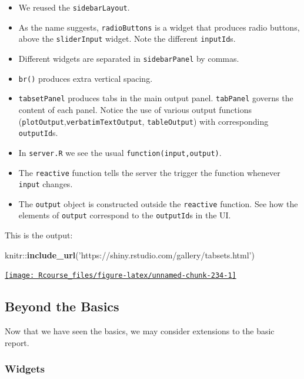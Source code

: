 \documentclass[]{book}
\newenvironment{Shaded}{\begin{snugshade}}{\end{snugshade}}
\newcommand{\KeywordTok}[1]{\textcolor[rgb]{0.13,0.29,0.53}{\textbf{{#1}}}}
\newcommand{\StringTok}[1]{\textcolor[rgb]{0.31,0.60,0.02}{{#1}}}
\newcommand{\NormalTok}[1]{{#1}}
\providecommand{\tightlist}{%
  \setlength{\itemsep}{0pt}\setlength{\parskip}{0pt}}
\theoremstyle{definition}
\theoremstyle{definition}
\theoremstyle{remark}
\begin{document}
\begin{itemize}
\tightlist
\item
  We reused the \texttt{sidebarLayout}.
\item
  As the name suggests, \texttt{radioButtons} is a widget that produces
  radio buttons, above the \texttt{sliderInput} widget. Note the
  different \texttt{inputId}s.
\item
  Different widgets are separated in \texttt{sidebarPanel} by commas.
\item
  \texttt{br()} produces extra vertical spacing.
\item
  \texttt{tabsetPanel} produces tabs in the main output panel.
  \texttt{tabPanel} governs the content of each panel. Notice the use of
  various output functions
  (\texttt{plotOutput},\texttt{verbatimTextOutput},
  \texttt{tableOutput}) with corresponding \texttt{outputId}s.
\item
  In \texttt{server.R} we see the usual \texttt{function(input,output)}.
\item
  The \texttt{reactive} function tells the server the trigger the
  function whenever \texttt{input} changes.
\item
  The \texttt{output} object is constructed outside the
  \texttt{reactive} function. See how the elements of \texttt{output}
  correspond to the \texttt{outputId}s in the UI.
\end{itemize}

This is the output:

\begin{Shaded}
\begin{Highlighting}[]
\NormalTok{knitr::}\KeywordTok{include_url}\NormalTok{(}\StringTok{'https://shiny.rstudio.com/gallery/tabsets.html'}\NormalTok{)}
\end{Highlighting}
\end{Shaded}

\href{https://shiny.rstudio.com/gallery/tabsets.html}{\texttt{[image: Rcourse\_files/figure-latex/unnamed-chunk-234-1]} }

\subsection{Beyond the Basics}\label{beyond-the-basics}

Now that we have seen the basics, we may consider extensions to the
basic report.

\subsubsection{Widgets}\label{widgets}
\end{document}
